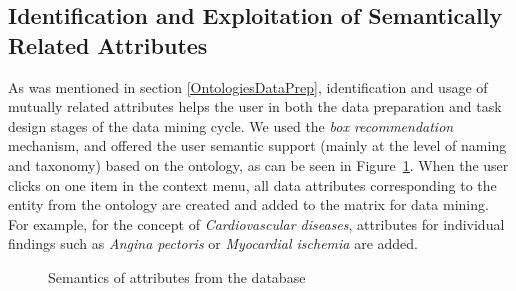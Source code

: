 
\subsection{Identification and Exploitation of Semantically Related Attributes} \label{RelatedAttributes}
As was mentioned in section \ref{OntologiesDataPrep}, identification and usage of mutually related attributes helps the user in both the data preparation and task design stages of the data mining cycle. 
We used the \emph{box recommendation} mechanism, and offered the user semantic support (mainly at the level of naming and taxonomy) based on the ontology, as can be seen in Figure~\ref{fig:BoxesAsking}. 
When the user clicks on one item in the context menu, all data attributes corresponding to the entity from the ontology are created and added to the matrix for data mining.
For example, for the concept of \emph{Cardiovascular diseases}, attributes for individual findings such as \emph{Angina pectoris} or \emph{Myocardial ischemia} are added.

\begin{figure}[htb]
\centering
\mbox{}
\caption{Semantics of attributes from the database}
\label{fig:BoxesAsking}	
\end{figure}